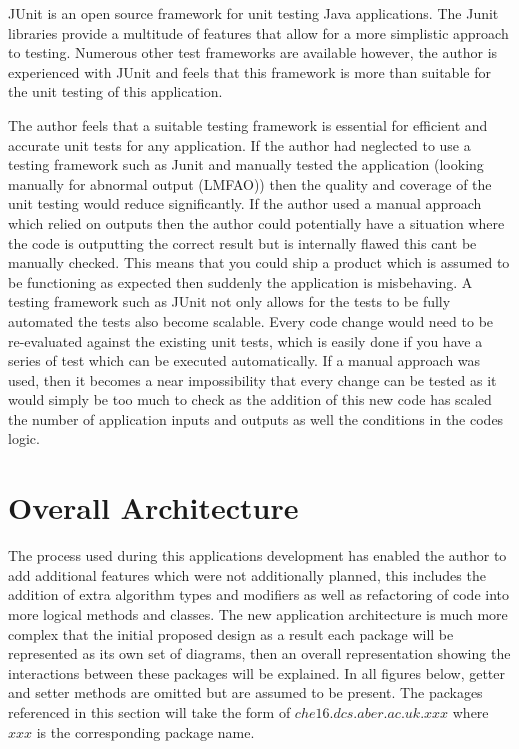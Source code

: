 JUnit is an open source framework for unit testing Java applications. The Junit libraries provide a multitude of features that allow for a more simplistic approach to testing. Numerous other test frameworks are available however, the author is experienced with JUnit and feels that this framework is more than suitable for the unit testing of this application.

The author feels that a suitable testing framework is essential for efficient and accurate unit tests for any application. If the author had neglected to use a testing framework such as Junit and manually tested the application (looking manually for abnormal output (LMFAO)) then the quality and coverage of the unit testing would reduce significantly. If the author used a manual approach which relied on outputs then the author could potentially have a situation where the code is outputting the correct result but is internally flawed this cant be manually checked. This means that you could ship a product which is assumed to be functioning as expected then suddenly the application is misbehaving. A testing framework such as JUnit not only allows for the tests to be fully automated the tests also become scalable. Every code change would need to be re-evaluated against the existing unit tests, which is easily done if you have a series of test which can be executed automatically. If a manual approach was used, then it becomes a near impossibility that every change can be tested as it would simply be too much to check as the addition of this new code has scaled the number of application inputs and outputs as well the conditions in the codes logic.

\section{Overall Architecture}

The process used during this applications development has enabled the author to add additional features which were not additionally planned, this includes the addition of extra algorithm types and modifiers as well as refactoring of code into more logical methods and classes. The new application architecture is much more complex that the initial proposed design as a result each package will be represented as its own set of diagrams, then an overall representation showing the interactions between these packages will be explained. In all figures below, getter and setter methods are omitted but are assumed to be present. The packages referenced in this section will take the form of $che16.dcs.aber.ac.uk.xxx$ where $xxx$ is the corresponding package name.

